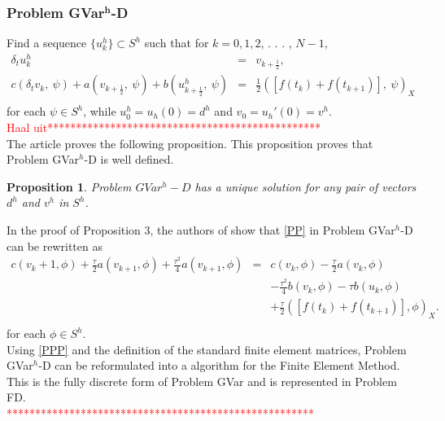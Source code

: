 \documentclass[../../main.tex]{subfiles}
\begin{document}
\subsubsection*{Problem GVar$^\mathbf{{h}}$-D}
Find a sequence $\{u_{k}^{h}\}\subset S^{h}$ such that for $k=0,1,2$, . . . , $N-1,$
\begin{eqnarray}
	\delta_{t}u_{k}^{h}\ & = & v_{k+\frac{1}{2}},\\
	c(\delta_{t}v_{k},\ \psi)+a(v_{k+\frac{1}{2}},\ \psi)+b(u_{k+\frac{1}{2}}^{h},\ \psi) & = & \frac{1}{2}([f(t_{k})+f(t_{k+1})],\ \psi)_{X} \nonumber \\ \label{PP}
\end{eqnarray}
for each $\psi\in S^{h}$, while $u_{0}^{h}=u_{h}(0)=d^{h}$ and $v_{0}=u_{h}'(0)=v^{h}$.\\


\textcolor{red}{Haal uit************************************************}\\
The article \cite{BV13} proves the following proposition. This proposition proves that Problem GVar$^h$-D is well defined.

\newtheorem{DC_Prop4}[DC_Prop2]{Proposition}
\begin{DC_Prop4}
	Problem $GVar^{h}-D$ has a unique solution for any pair of vectors $d^{h}$ and $v^{h}$ in $S^{h}$.
\end{DC_Prop4}

In the proof of Proposition 3, the authors of \cite{BV13} show that \eqref{PP} in Problem GVar$^h$-D can be rewritten as
\begin{eqnarray}
	c(v_k+1,\phi) + \frac{\tau}{2} a(v_{k+1},\phi) + \frac{\tau^2}{4} a(v_{k+1},\phi) & = & c(v_k,\phi) - \frac{\tau}{2} a(v_k,\phi) \nonumber \\  &&
	- \frac{\tau^2}{4}b(v_k,\phi) - \tau b(u_k,\phi) \nonumber\\
	&&+\frac{\tau}{2}([f(t_k)+f(t_{k+1})],\phi)_X.\nonumber \\ \label{PPP}
\end{eqnarray} for each $\phi \in S^h$.\\

Using \eqref{PPP} and the definition of the standard finite element matrices, Problem GVar$^h$-D can be reformulated into a algorithm for the Finite Element Method. This is the fully discrete form of Problem GVar and is represented in Problem FD.\\
\textcolor{red}{******************************************************}\\
\end{document}
